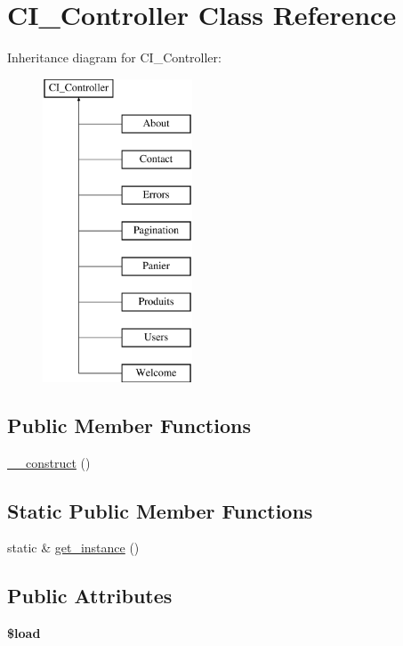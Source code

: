 \hypertarget{class_c_i___controller}{}\section{C\+I\+\_\+\+Controller Class Reference}
\label{class_c_i___controller}
Inheritance diagram for C\+I\+\_\+\+Controller\+:\begin{figure}[H]
\begin{center}
\leavevmode
\includegraphics[height=9.000000cm]{class_c_i___controller}
\end{center}
\end{figure}
\subsection*{Public Member Functions}
\begin{DoxyCompactItemize}
\item 
\mbox{\hyperlink{class_c_i___controller_a3934262676ae6c34d3cbd4d1065efe20}{\+\_\+\+\_\+construct}} ()
\end{DoxyCompactItemize}
\subsection*{Static Public Member Functions}
\begin{DoxyCompactItemize}
\item 
static \& \mbox{\hyperlink{class_c_i___controller_aebdd6410c6d9773fff8c574c65f5cb60}{get\+\_\+instance}} ()
\end{DoxyCompactItemize}
\subsection*{Public Attributes}
\begin{DoxyCompactItemize}
\item 
\mbox{\label{class_c_i___controller_ad52534b9646a185b1202cc3cada05acf}} 
{\bfseries \$load}
\end{DoxyCompactItemize}


